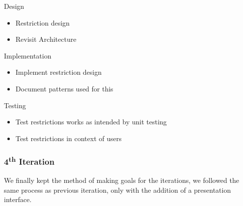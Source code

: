   Design
  \begin{itemize}
    \item Restriction design
    \item Revisit Architecture
  \end{itemize}

  Implementation
  \begin{itemize}
    \item Implement restriction design
    \item Document patterns used for this
  \end{itemize}

  Testing
  \begin{itemize}
    \item Test restrictions works as intended by unit testing
    \item Test restrictions in context of users
  \end{itemize}

\subsubsection{4\textsuperscript{th} Iteration}

  We finally kept the method of making goals for the iterations, we followed the same process as previous iteration, only with the addition of a presentation interface.
